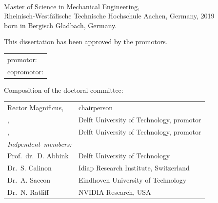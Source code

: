 \begin{titlepage}
\begin{center}
\makeatletter
{\Large\titlefont\bfseries\@firstname\ {\titleshape\@lastname}}
\makeatother

\bigskip
\bigskip

Master of Science in Mechanical Engineering, \\
Rheinisch-Westfälische Technische Hochschule Aachen,
Germany, 2019 \\
born in Bergisch Gladbach, Germany.

\vspace*{2\bigskipamount}

\end{center}

\clearpage
\thispagestyle{empty}

\noindent This dissertation has been approved by the
promotors.

\medskip\noindent
\begin{tabular}{l}
    promotor: \promotor{} \\
    copromotor: \copromotor{}
\end{tabular}

\bigskip
\noindent Composition of the doctoral committee:

\medskip\noindent
\begin{tabular}{p{4cm}l}
    Rector Magnificus, & chairperson\\
    \promotor{}, & Delft University of Technology, promotor \\
    \copromotor{}, & Delft University of Technology, promotor \\

    \medskip
    \mbox{\emph{Indpendent members:}} & \\

    Prof.\ dr.\ D. Abbink & Delft University of Technology \\
    Dr.\ S. Calinon & Idiap Research Institute,  Switzerland \\
    Dr.\ A. Saccon & Eindhoven University of Technology \\
    Dr.\ N. Ratliff & NVIDIA Research, USA \\

\end{tabular}


\end{titlepage}
